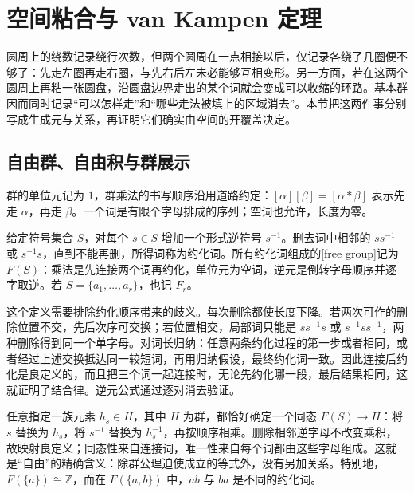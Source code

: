 
% 
% 

\section{空间粘合与 van Kampen 定理}
\label{g1:sec:0502}

圆周上的绕数记录绕行次数，但两个圆周在一点相接以后，仅记录各绕了几圈便不够了：先走左圈再走右圈，与先右后左未必能够互相变形。另一方面，若在这两个圆周上再粘一张圆盘，沿圆盘边界走出的某个词就会变成可以收缩的环路。基本群因而同时记录“可以怎样走”和“哪些走法被填上的区域消去”。本节把这两件事分别写成生成元与关系，再证明它们确实由空间的开覆盖决定。

\subsection{自由群、自由积与群展示}
\label{g1:subsec:0502:01}

群的单位元记为 \(1\)，群乘法的书写顺序沿用道路约定：\([\alpha][\beta]=[\alpha*\beta]\) 表示先走 \(\alpha\)，再走 \(\beta\)。一个词是有限个字母排成的序列；空词也允许，长度为零。

\begin{definition}\label{g1:def:free-group}
	给定符号集合 \(S\)，对每个 \(s\in S\) 增加一个形式逆符号 \(s^{-1}\)。删去词中相邻的 \(ss^{-1}\) 或 \(s^{-1}s\)，直到不能再删，所得词称为约化词。所有约化词组成的[free group]记为 \(F(S)\)：乘法是先连接两个词再约化，单位元为空词，逆元是倒转字母顺序并逐字取逆。若 \(S=\{a_1,\ldots,a_r\}\)，也记 \(F_r\)。
\end{definition}

这个定义需要排除约化顺序带来的歧义。每次删除都使长度下降。若两次可作的删除位置不交，先后次序可交换；若位置相交，局部词只能是 \(ss^{-1}s\) 或 \(s^{-1}ss^{-1}\)，两种删除得到同一个单字母。对词长归纳：任意两条约化过程的第一步或者相同，或者经过上述交换抵达同一较短词，再用归纳假设，最终约化词一致。因此连接后约化是良定义的，而且把三个词一起连接时，无论先约化哪一段，最后结果相同，这就证明了结合律。逆元公式通过逐对消去验证。

任意指定一族元素 \(h_s\in H\)，其中 \(H\) 为群，都恰好确定一个同态 \(F(S)\to H\)：将 \(s\) 替换为 \(h_s\)，将 \(s^{-1}\) 替换为 \(h_s^{-1}\)，再按顺序相乘。删除相邻逆字母不改变乘积，故映射良定义；同态性来自连接词，唯一性来自每个词都由这些字母组成。这就是“自由”的精确含义：除群公理迫使成立的等式外，没有另加关系。特别地，\(F(\{a\})\cong\mathbb Z\)，而在 \(F(\{a,b\})\) 中，\(ab\) 与 \(ba\) 是不同的约化词。

